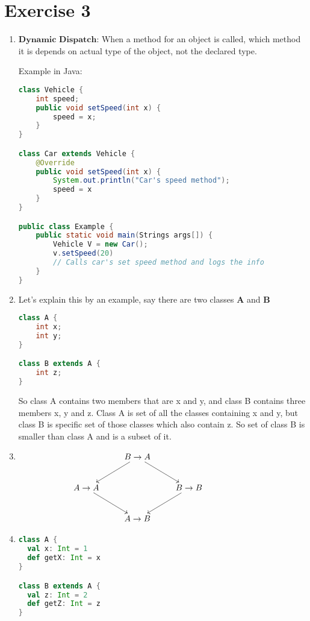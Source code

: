 \documentclass[12pt]{article}
\begin{document}
\section*{Exercise 3}
\begin{enumerate}[label=(\alph*)]
\item $\textbf{Dynamic Dispatch:}$ When a method for an object is called, which method it is depends on actual type of the object, not the declared type.

Example in Java:
\begin{lstlisting}[language=Java]
class Vehicle {
	int speed;
	public void setSpeed(int x) {
		speed = x;
	}
}

class Car extends Vehicle {
	@Override
	public void setSpeed(int x) {
		System.out.println("Car's speed method");
		speed = x	
	}
}

public class Example {
	public static void main(Strings args[]) {
		Vehicle V = new Car();
		v.setSpeed(20) 
		// Calls car's set speed method and logs the info	
	}
}
\end{lstlisting}

\item Let's explain this by an example, say there are two classes $\textbf{A}$ and $\textbf{B}$

\begin{lstlisting}[language=Java]
class A {
	int x;
	int y;
}

class B extends A {
	int z;
}
\end{lstlisting}

So class A contains two members that are x and y, and class B contains three members x, y and z. Class A is set of all the classes containing x and y, but class B is specific set of those classes which also contain z. So set of class B is smaller than class A and is a subset of it.

\item
\[
\xymatrix{
  & B \rightarrow A \ar[dl] \ar[dr] \\
  A \rightarrow A\ar[rd] && B \rightarrow B \ar[dl]\\
  & A \rightarrow B
}\hspace{6em}%
\]

\item 

\begin{lstlisting}[language=Scala]
class A {
  val x: Int = 1
  def getX: Int = x
}

class B extends A {
  val z: Int = 2
  def getZ: Int = z
}


\end{lstlisting}
\end{enumerate}
\end{document}
